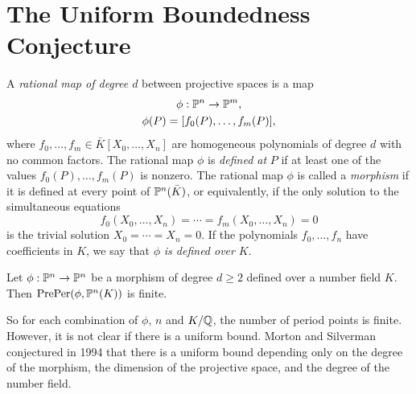 




\section{The Uniform Boundedness Conjecture}

\begin{definition}
\end{definition}

\begin{definition}
  A \emph{rational map of degree $d$} between projective spaces is a
  map
  \[
  \begin{gathered}
    \phi: \P^n \to \P^m,\\
    \phi(P) = [f_0(P), \dots, f_m(P)],
  \end{gathered}
  \]
  where $f_0, \dots, f_m \in \bar{K}[X_0, \dots, X_n]$ are homogeneous
  polynomials of degree $d$ with no common factors. The rational map
  $\phi$ is \emph{defined at} $P$ if at least one of the values
  $f_0(P), \dots, f_m(P)$ is nonzero. The rational map $\phi$ is
  called a \emph{morphism} if it is defined at every point of
  $\P^n(\bar{K})$, or equivalently, if the only solution to the
  simultaneous equations
  \[
  f_0(X_0, \dots, X_n) = \cdots = f_m(X_0, \dots, X_n) = 0
  \]
  is the trivial solution $X_0 = \cdots = X_n = 0$. If the polynomials
  $f_0, \dots, f_n$ have coefficients in $K$, we say that $\phi$
  \emph{is defined over} $K$.
\end{definition}

\begin{example}[Morphism]
\end{example}

\begin{definition}
\end{definition}

\begin{theorem}[Northcott, 1950]
  Let $\phi: \P^n \to \P^n$ be a morphism of degree $d \ge 2$ defined
  over a number field $K$. Then $\preper(\phi, \P^n(K))$ is finite.
\end{theorem}

\begin{remark}
  So for each combination of $\phi$, $n$ and $K/\Q$, the number of
  period points is finite. However, it is not clear if there is a
  uniform bound. Morton and Silverman conjectured in 1994 that there
  is a uniform bound depending only on the degree of the morphism, the
  dimension of the projective space, and the degree of the number
  field.
\end{remark}

